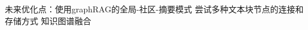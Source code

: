 \documentclass{xmu}
\begin{document}
未来优化点：使用graphRAG的全局-社区-摘要模式
尝试多种文本块节点的连接和存储方式
知识图谱融合
\end{document}

